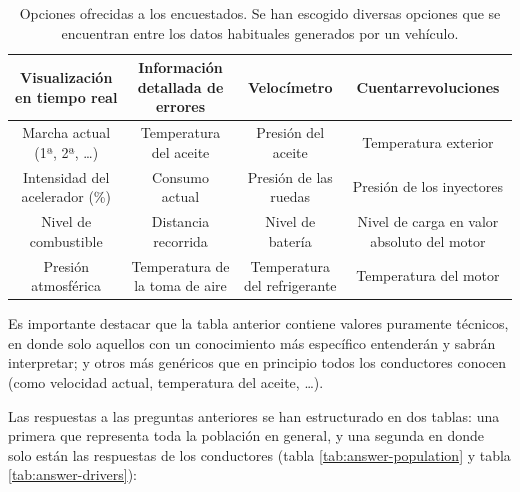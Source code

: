 \begin{table}[H]
  \centering
  \begin{tabularx}{\textwidth}{| C{.25} | C{.25} | C{.25}| C{.25} |}
    \hline
    Visualización en tiempo real   & Información detallada de errores & Velocímetro                  & Cuentarrevoluciones                        \\
    \hline
    Marcha actual (1ª, 2ª, \dots)  & Temperatura del aceite           & Presión del aceite           & Temperatura exterior                       \\
    \hline
    Intensidad del acelerador (\%) & Consumo actual                   & Presión de las ruedas        & Presión de los inyectores                  \\
    \hline
    Nivel de combustible           & Distancia recorrida              & Nivel de batería             & Nivel de carga en valor absoluto del motor \\
    \hline
    Presión atmosférica            & Temperatura de la toma de aire   & Temperatura del refrigerante & Temperatura del motor                      \\
    \hline
  \end{tabularx}
  \caption{Opciones ofrecidas a los encuestados. Se han escogido diversas opciones que se encuentran entre los datos habituales generados por un vehículo.}
  \label{tab:quest-options}
\end{table}

Es importante destacar que la tabla anterior contiene valores puramente técnicos,
en donde solo aquellos con un conocimiento más específico entenderán y sabrán
interpretar; y otros más genéricos que en principio todos los conductores conocen
(como velocidad actual, temperatura del aceite, \dots).

Las respuestas a las preguntas anteriores se han estructurado en dos tablas: una
primera que representa toda la población en general, y una segunda en donde solo
están las respuestas de los conductores (tabla \ref{tab:answer-population} y tabla
\ref{tab:answer-drivers}):

